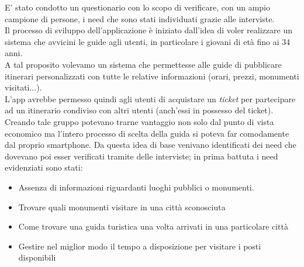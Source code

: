  E' stato condotto un questionario con lo scopo di verificare, con un ampio campione di persone, i need che sono stati individuati grazie alle interviste.\\
Il processo di sviluppo dell'applicazione è iniziato dall'idea di voler realizzare un sistema che avvicini le guide agli utenti, in particolare i giovani di età fino ai 34 anni.\\
A tal proposito volevamo un sistema che permettesse alle guide di pubblicare itinerari personalizzati con tutte le relative informazioni (orari, prezzi, monumenti visitati...).\\
L'app avrebbe permesso quindi agli utenti di acquistare un \emph{ticket} per partecipare ad un itinerario condiviso con altri utenti (anch'essi in possesso del ticket). Creando tale gruppo potevano trarne vantaggio non solo dal punto di vista economico ma l'intero processo di scelta della guida si poteva far comodamente dal proprio smartphone.
Da questa idea di base venivano identificati dei need che dovevano poi esser verificati tramite delle interviste; in prima battuta i need evidenziati sono stati:
\begin{itemize}
	\item Assenza di informazioni riguardanti luoghi pubblici o monumenti.
	\item Trovare quali monumenti visitare in una città sconosciuta 
	\item Come trovare una guida turistica una volta arrivati in una particolare città
	\item Gestire nel miglior modo il tempo a disposizione per visitare i posti disponibili
	
\end{itemize}
